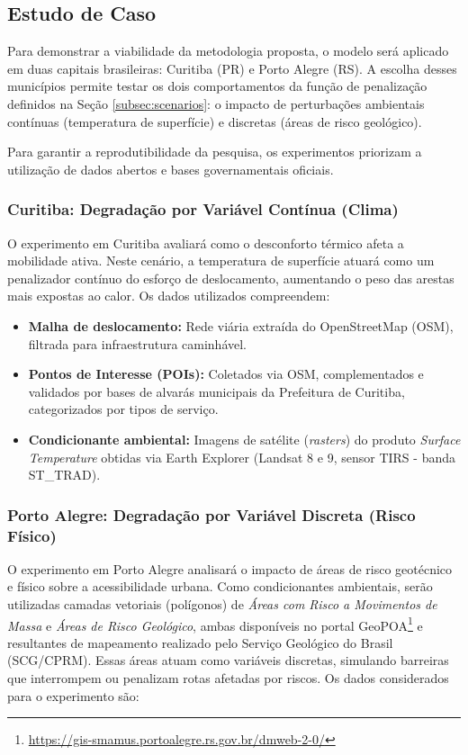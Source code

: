 \subsection{Estudo de Caso}
\label{subsec:case_study}

Para demonstrar a viabilidade da metodologia proposta, o modelo será aplicado em duas capitais brasileiras: Curitiba (PR) e Porto Alegre (RS). A escolha desses municípios permite testar os dois comportamentos da função de penalização definidos na Seção \ref{subsec:scenarios}: o impacto de perturbações ambientais contínuas (temperatura de superfície) e discretas (áreas de risco geológico).

Para garantir a reprodutibilidade da pesquisa, os experimentos priorizam a utilização de dados abertos e bases governamentais oficiais.

\subsubsection{Curitiba: Degradação por Variável Contínua (Clima)}
O experimento em Curitiba avaliará como o desconforto térmico afeta a mobilidade ativa. Neste cenário, a temperatura de superfície atuará como um penalizador contínuo do esforço de deslocamento, aumentando o peso das arestas mais expostas ao calor. Os dados utilizados compreendem:

\begin{itemize}
    \item \textbf{Malha de deslocamento:} Rede viária extraída do OpenStreetMap (OSM), filtrada para infraestrutura caminhável.
    \item \textbf{Pontos de Interesse (POIs):} Coletados via OSM, complementados e validados por bases de alvarás municipais da Prefeitura de Curitiba, categorizados por tipos de serviço.
    \item \textbf{Condicionante ambiental:} Imagens de satélite (\textit{rasters}) do produto \textit{Surface Temperature} obtidas via Earth Explorer (Landsat 8 e 9, sensor TIRS - banda ST\_TRAD).
\end{itemize}

\subsubsection{Porto Alegre: Degradação por Variável Discreta (Risco Físico)}
O experimento em Porto Alegre analisará o impacto de áreas de risco geotécnico e físico sobre a acessibilidade urbana. Como condicionantes ambientais, serão utilizadas camadas vetoriais (polígonos) de \textit{Áreas com Risco a Movimentos de Massa} e \textit{Áreas de Risco Geológico}, ambas disponíveis no portal GeoPOA\footnote{\url{https://gis-smamus.portoalegre.rs.gov.br/dmweb-2-0/}} e resultantes de mapeamento realizado pelo Serviço Geológico do Brasil (SCG/CPRM). Essas áreas atuam como variáveis discretas, simulando barreiras que interrompem ou penalizam rotas afetadas por riscos. Os dados considerados para o experimento são:

